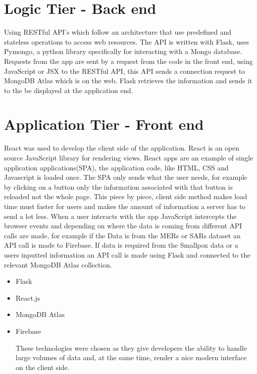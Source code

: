 \section{Logic Tier - Back end}
Using RESTful API's which follow an architecture that use predefined and stateless operations to access web resources.
The API is written with Flask, uses Pymongo, a python library specifically for interacting with a Mongo database.
Requests from the app are sent by a request from the code in the front end, using JavaScript or JSX to the RESTful API, this API sends a connection request to MongoDB Atlas which is on the web. Flask retrieves the information and sends it to the be displayed at the application end.

\section{Application Tier - Front end}
React was used to develop the client side of the application. React is an open source JavaScript library for rendering views. React apps are an example of single application applications(SPA), the application code, like HTML, CSS and Javascript is loaded once. The SPA only sends what the user needs, for example by clicking on a button only the information associated with that button is reloaded not the whole page. This piece by piece, client side method makes load time must faster for users and makes the amount of information a server has to send a lot less.
When a user interacts with the app JavaScript intercepts the browser events and depending on where the data is coming from different API calls are made, for example if the Data is from the MERs or SARs dataset an API call is made to Firebase. If data is required from the Smallpox data or a users inputted information an API call is made using Flask and connected to the relevant MongoDB Atlas collection.


\begin{itemize}
\item Flask
\item React.js
\item MongoDB Atlas
\item Firebase


These technologies were chosen as they give developers the ability to handle large volumes of data and, at the same time, render a nice modern interface on the client side.

\end{itemize}

